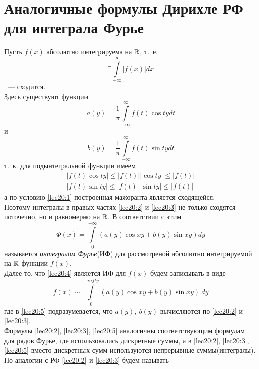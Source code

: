\documentclass[../../main.tex]{subfiles}
\begin{document}
\section{Аналогичные формулы Дирихле РФ для интеграла Фурье}

Пусть $ f(x) $ абсолютно интегрируема на $ \mathbb{R} $, т.~е.
\begin{equation}
\label{lec20:1}
\exists \int\limits_{-\infty}^\infty |f(x)| dx
\end{equation}
~--- сходится.\\
Здесь существуют функции
\begin{equation}
\label{lec20:2}
a(y) = \dfrac{1}{\pi} \int\limits_{-\infty}^\infty 
f(t) \cos ty dt
\end{equation}
и
\begin{equation}
\label{lec20:3}
b(y) = \dfrac{1}{\pi} \int\limits_{-\infty}^\infty
f(t) \sin ty dt
\end{equation}
т.~к. для подынтегральной функции имеем
\[
\begin{gathered}
|f(t) \cos ty| \leq |f(t)||\cos ty| \leq |f(t)|\\
|f(t) \sin ty| \leq |f(t)||\sin ty| \leq |f(t)|
\end{gathered}
\]
а по условию \eqref{lec20:1} построенная мажоранта является сходящейся.\\
Поэтому интегралы в правых частях \eqref{lec20:2} и \eqref{lec20:3}
не только сходятся поточечно, но и равномерно на $ \mathbb{R} $.
В соответствии с этим 
\begin{equation}
\label{lec20:4}
\Phi(x) = \int\limits_0^{+\infty} \left(
a(y) \cos xy + b(y) \sin xy
\right) dy
\end{equation}
называется \emph{интегралом Фурье}(ИФ) для рассмотреной
абсолютно интегрируемой на $ \mathbb{R} $ функции $ f(x) $.\\
Далее то, что \eqref{lec20:4} является ИФ для $ f(x) $ будем записывать в виде
\begin{equation}
\label{lec20:5}
f(x) \sim \int\limits_0^{+infty} \left(
a(y) \cos xy + b(y) \sin xy
\right) \ dy
\end{equation}
где в \eqref{lec20:5} подразумевается, что $ a(y),\ b(y) $ вычисляются по 
\eqref{lec20:2} и \eqref{lec20:3}.\\
Формулы \eqref{lec20:2}, \eqref{lec20:3}, \eqref{lec20:5} аналогичны
соответствующим формулам для рядов Фурье, где 
использовались дискретные суммы, а в 
\eqref{lec20:2}, \eqref{lec20:3}, \eqref{lec20:5}
вместо дискретных сумм используются непрерывные суммы(интегралы).
По аналогии с РФ \eqref{lec20:2} и \eqref{lec20:3} будем называть 
\end{document}
